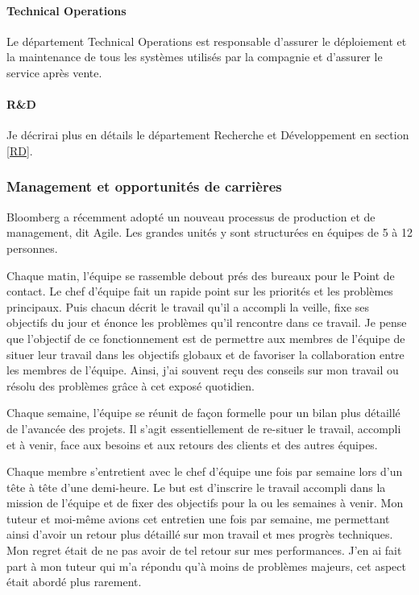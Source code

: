 \documentclass[11pt, oneside, titlepage, a4paper]{article}
\begin{document}
\paragraph{Technical Operations}
Le département Technical Operations est responsable d'assurer le déploiement et la maintenance de tous les systèmes utilisés par la compagnie et d'assurer le \og service après vente\fg{}.
\paragraph{R\&D} Je décrirai plus en détails le département Recherche et Développement en section \ref{RD}.
		\subsubsection{Management et opportunités de carrières}
Bloomberg a récemment adopté un nouveau processus de production et de management, dit \og Agile\fg{}. Les grandes unités y sont structurées en équipes de 5 à 12 personnes.

Chaque matin, l'équipe se rassemble debout prés des bureaux pour le \og Point de contact\fg{}. Le chef d'équipe fait un rapide point sur les priorités et les problèmes principaux. Puis chacun décrit le travail qu'il a accompli la veille, fixe ses objectifs du jour et énonce les problèmes qu'il rencontre dans ce travail. Je pense que l'objectif de ce fonctionnement est de permettre aux membres de l'équipe de situer leur travail dans les objectifs globaux et de favoriser la collaboration entre les membres de l'équipe. Ainsi, j'ai souvent reçu des conseils sur mon travail ou résolu des problèmes grâce à cet exposé quotidien.

Chaque semaine, l'équipe se réunit de façon formelle pour un bilan plus détaillé de l'avancée des projets. Il s'agit essentiellement de re-situer le travail, accompli et à venir, face aux besoins et aux retours des clients et des autres équipes.

Chaque membre s'entretient avec le chef d'équipe une fois par semaine lors d'un \og tête à tête\fg{} d'une demi-heure. Le but est d'inscrire le travail accompli dans la mission de l'équipe et de fixer des objectifs pour la ou les semaines à venir. Mon tuteur et moi-même avions cet entretien une fois par semaine, me permettant ainsi d'avoir un retour plus détaillé sur mon travail et mes progrès techniques. Mon regret était de ne pas avoir de tel retour sur mes performances. J'en ai fait part à mon tuteur qui m'a répondu qu'à moins de problèmes majeurs, cet aspect était abordé plus rarement.
\end{document}
